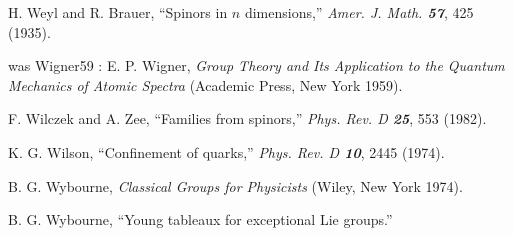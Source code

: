
 H. Weyl and R. Brauer,
    ``Spinors in $n$ dimensions,''
    {\em Amer. J. Math.   \bf 57}, 425 (1935).

was Wigner59 :
 E. P. Wigner,
    {\em Group Theory and Its Application to the Quantum Mechanics
        of Atomic Spectra}
    (Academic Press, New York 1959).

F. Wilczek and A. Zee,
``Families from spinors,''
{\em Phys.  Rev.    D \bf 25}, 553 (1982).

K. G. Wilson,
``Confinement of quarks,''
{\em Phys.  Rev.    D \bf 10}, 2445 (1974).


 B. G. Wybourne,
    {\em Classical Groups for Physicists}
    (Wiley, New York 1974).



B. G. Wybourne,
        ``Young tableaux for exceptional Lie groups.''




